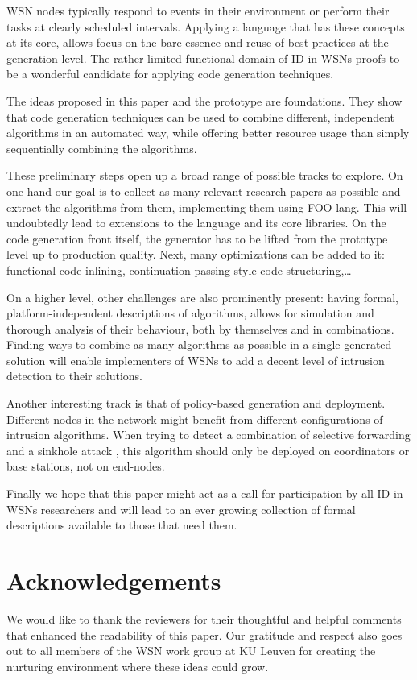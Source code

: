\documentclass[conference]{IEEEtran}
\begin{document}
WSN nodes typically respond to events in their environment or perform their
tasks at clearly scheduled intervals. Applying a language that has these
concepts at its core, allows focus on the bare essence and reuse of best
practices at the generation level. The rather limited functional domain of ID
in WSNs proofs to be a wonderful candidate for applying code generation
techniques.

The ideas proposed in this paper and the prototype are foundations. They show
that code generation techniques can be used to combine different, independent
algorithms in an automated way, while offering better resource usage than
simply sequentially combining the algorithms.

These preliminary steps open up a broad range of possible tracks to explore. On
one hand our goal is to collect as many relevant research papers as possible
and extract the algorithms from them, implementing them using FOO-lang. This
will undoubtedly lead to extensions to the language and its core libraries. On
the code generation front itself, the generator has to be lifted from the
prototype level up to production quality. Next, many optimizations can be added
to it: functional code inlining, continuation-passing style code
structuring,\dots

On a higher level, other challenges are also prominently present: having
formal, platform-independent descriptions of algorithms, allows for simulation
and thorough analysis of their behaviour, both by themselves and in
combinations. Finding ways to combine as many algorithms as possible in a
single generated solution will enable implementers of WSNs to add a decent
level of intrusion detection to their solutions.

Another interesting track is that of policy-based generation and deployment.
Different nodes in the network might benefit from different configurations of
intrusion algorithms. When trying to detect a combination of selective
forwarding and a sinkhole attack \cite{ngai2006intruder}, this algorithm should
only be deployed on coordinators or base stations, not on end-nodes.

Finally we hope that this paper might act as a call-for-participation by all
ID in WSNs researchers and will lead to an ever growing collection of formal
descriptions available to those that need them.

\section*{Acknowledgements}
\label{section:acknowledgements}

We would like to thank the reviewers for their thoughtful and helpful comments
that enhanced the readability of this paper. Our gratitude and respect also
goes out to all members of the WSN work group at KU Leuven for creating the
nurturing environment where these ideas could grow.



\end{document}
